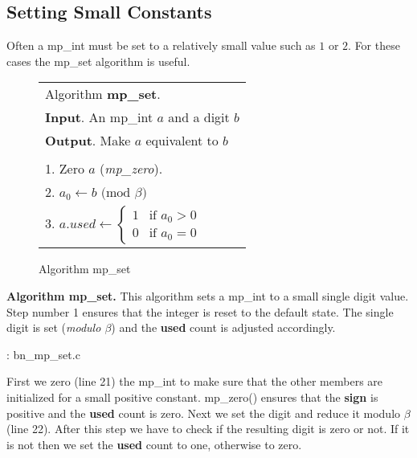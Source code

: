 \documentclass[b5paper]{book}
\begin{document}
\subsection{Setting Small Constants}
Often a mp\_int must be set to a relatively small value such as $1$ or $2$.  For these cases the mp\_set algorithm is useful.

\newpage\begin{figure}[here]
\begin{center}
\begin{tabular}{l}
\hline Algorithm \textbf{mp\_set}. \\
\textbf{Input}.   An mp\_int $a$ and a digit $b$ \\
\textbf{Output}.  Make $a$ equivalent to $b$ \\
\hline \\
1.  Zero $a$ (\textit{mp\_zero}). \\
2.  $a_0 \leftarrow b \mbox{ (mod }\beta\mbox{)}$ \\
3.  $a.used \leftarrow  \left \lbrace \begin{array}{ll}
                              1 &  \mbox{if }a_0 > 0 \\
                              0 &  \mbox{if }a_0 = 0 
                              \end{array} \right .$ \\
\hline                              
\end{tabular}
\end{center}
\caption{Algorithm mp\_set}
\end{figure}

\textbf{Algorithm mp\_set.}
This algorithm sets a mp\_int to a small single digit value.  Step number 1 ensures that the integer is reset to the default state.  The
single digit is set (\textit{modulo $\beta$}) and the \textbf{used} count is adjusted accordingly.

\vspace{+3mm}\begin{small}
\hspace{-5.1mm}{\bf File}: bn\_mp\_set.c
\vspace{-3mm}
\begin{alltt}
\end{alltt}
\end{small}

First we zero (line 21) the mp\_int to make sure that the other members are initialized for a 
small positive constant.  mp\_zero() ensures that the \textbf{sign} is positive and the \textbf{used} count
is zero.  Next we set the digit and reduce it modulo $\beta$ (line 22).  After this step we have to 
check if the resulting digit is zero or not.  If it is not then we set the \textbf{used} count to one, otherwise
to zero.
\end{document}
